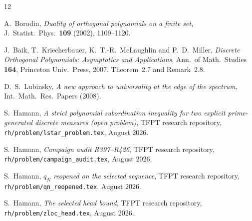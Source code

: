 \documentclass[11pt]{article}
\theoremstyle{remark}
\begin{document}
\begin{thebibliography}{12}

A.~Borodin,
\emph{Duality of orthogonal polynomials on a finite set},
J.~Statist.\ Phys.\ \textbf{109} (2002), 1109--1120.

J.~Baik, T.~Kriecherbauer, K.~T.-R.~McLaughlin and P.~D.~Miller,
\emph{Discrete Orthogonal Polynomials: Asymptotics and Applications},
Ann.\ of Math.\ Studies \textbf{164}, Princeton Univ.\ Press, 2007.
Theorem~2.7 and Remark~2.8.

D.~S.~Lubinsky,
\emph{A new approach to universality at the edge of the spectrum},
Int.\ Math.\ Res.\ Papers (2008).

S.~Hamann,
\emph{A strict polynomial subordination inequality for two explicit
prime-generated discrete measures (open problem)},
TFPT research repository, \texttt{rh/problem/lstar\_problem.tex},
August 2026.

S.~Hamann,
\emph{Campaign audit R397--R426},
TFPT research repository, \texttt{rh/problem/campaign\_audit.tex},
August 2026.

S.~Hamann,
\emph{$q_{N}$ reopened on the selected sequence},
TFPT research repository, \texttt{rh/problem/qn\_reopened.tex},
August 2026.

S.~Hamann,
\emph{The selected head bound},
TFPT research repository, \texttt{rh/problem/zloc\_head.tex},
August 2026.

\end{thebibliography}
\end{document}
